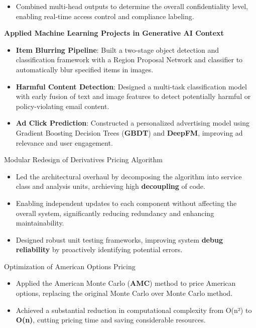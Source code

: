 \begin{cventries}
{\begin{cvitems}
\begin{itemize}
      \item Combined multi-head outputs to determine the overall confidentiality level, enabling real-time access control and compliance labeling.
    \end{itemize}
    \item \textbf{Applied Machine Learning Projects in Generative AI Context}
    \begin{itemize}
      \item \textbf{Item Blurring Pipeline}: Built a two-stage object detection and classification framework with a Region Proposal Network and classifier to automatically blur specified items in images.
      \item \textbf{Harmful Content Detection}: Designed a multi-task classification model with early fusion of text and image features to detect potentially harmful or policy-violating email content.
      \item \textbf{Ad Click Prediction}: Constructed a personalized advertising model using Gradient Boosting Decision Trees (\textbf{GBDT}) and \textbf{DeepFM}, improving ad relevance and user engagement.
    \end{itemize}
    \item Modular Redesign of Derivatives Pricing Algorithm
    \begin{itemize}
      \item Led the architectural overhaul by decomposing the algorithm into service class and analysis units, archieving high \textbf{decoupling} of code.
      \item Enabling independent updates to each component without affecting the overall system, significantly reducing redundancy and enhancing maintainability.
      \item Designed robust unit testing frameworks, improving system \textbf{debug reliability} by proactively identifying potential errors.
    \end{itemize}
    \item Optimization of American Options Pricing
    \begin{itemize}
      \item Applied the American Monte Carlo (\textbf{AMC}) method to price American options, replacing the original Monte Carlo over Monte Carlo method. 
      \item Achieved a substantial reduction in computational complexity from O(n²) to \textbf{O(n)}, cutting pricing time and saving considerable resources.
    \end{itemize}

\end{cvitems}}
\end{cventries}
